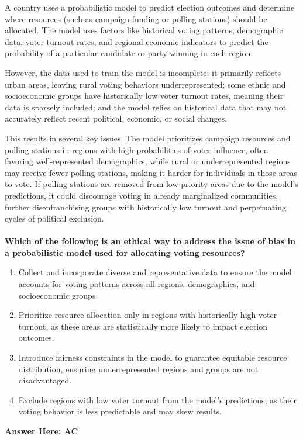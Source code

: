 \documentclass{article}
\begin{document}
A country uses a probabilistic model to predict election outcomes and determine where resources 
(such as campaign funding or polling stations) should be allocated. The model uses factors like 
historical voting patterns, demographic data, voter turnout rates, and regional economic indicators 
to predict the probability of a particular candidate or party winning in each region. 

However, the data used to train the model is incomplete: it primarily reflects urban areas, leaving 
rural voting behaviors underrepresented; some ethnic and socioeconomic groups have historically 
low voter turnout rates, meaning their data is sparsely included; and the model relies on historical 
data that may not accurately reflect recent political, economic, or social changes. 

This results in several key issues. The model prioritizes campaign resources and polling stations 
in regions with high probabilities of voter influence, often favoring well-represented demographics, 
while rural or underrepresented regions may receive fewer polling stations, making it harder for 
individuals in those areas to vote. If polling stations are removed from low-priority areas due to 
the model's predictions, it could discourage voting in already marginalized communities, further 
disenfranchising groups with historically low turnout and perpetuating cycles of political exclusion. 
 \\ \\

\textbf{Which of the following is an ethical way to address the issue of bias in a probabilistic model used for allocating voting resources?}
\begin{enumerate}[label=\Alph*)]
    \item Collect and incorporate diverse and representative data to ensure the model accounts for voting patterns across all regions, demographics, and socioeconomic groups.
    \item Prioritize resource allocation only in regions with historically high voter turnout, as these areas are statistically more likely to impact election outcomes.
    \item Introduce fairness constraints in the model to guarantee equitable resource distribution, ensuring underrepresented regions and groups are not disadvantaged.
    \item Exclude regions with low voter turnout from the model’s predictions, as their voting behavior is less predictable and may skew results.
\end{enumerate}
\textbf{Answer Here: AC}
\end{document}
